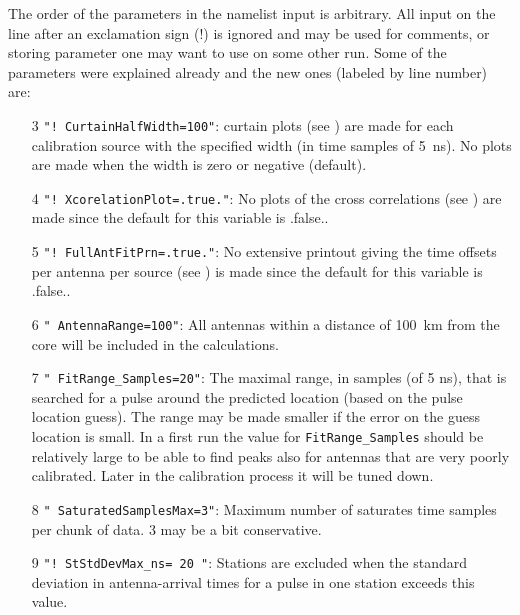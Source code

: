 The order of the parameters in the namelist input is arbitrary. All input on the line after an exclamation sign (!) is ignored and may be used for comments, or storing parameter one may want to use on some other run. Some of the parameters were explained already and the new ones (labeled by line number) are:
\begin{enumerate}
\item[3] \verb#"! CurtainHalfWidth=100"#: curtain plots (see ) are made for each calibration source with the specified width (in time samples of 5~ns). No plots are made when the width is zero or negative (default).
\item[4] \verb#"! XcorelationPlot=.true."#: No plots of the cross correlations (see ) are made since the default for this variable is .false..
\item[5] \verb#"! FullAntFitPrn=.true."#: No extensive printout giving the time offsets per antenna per source (see ) is made since the default for this variable is .false..
\item[6] \verb#" AntennaRange=100"#: All antennas within a distance of 100~km from the core will be included in the calculations.
\item[7] \verb#" FitRange_Samples=20"#: The maximal range, in samples (of 5 ns), that is searched for a pulse around the predicted location (based on the pulse location guess). The range may be made smaller if the error on the guess location is small. In a first run the value for \verb!FitRange_Samples! should be relatively large to be able to find peaks also for antennas that are very poorly calibrated. Later in the calibration process it will be tuned down.
\item[8] \verb#" SaturatedSamplesMax=3"#:  Maximum number of saturates time samples per chunk of data. 3 may be a bit conservative.
\item[9] \verb#"! StStdDevMax_ns= 20 "#:  Stations are excluded when the standard deviation in antenna-arrival times for a pulse in one station exceeds this value.

\end{enumerate}
